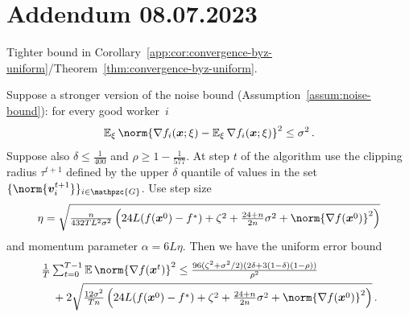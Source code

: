 \documentclass{article}
\newcommand{\gset}{\ensuremath{{\mathpzc{G}}}}
\begin{document}
\section{Addendum 08.07.2023}\label{sec:addendum}

Tighter bound in Corollary~\ref{app:cor:convergence-byz-uniform}/Theorem~\ref{thm:convergence-byz-uniform}.

\begin{corollary}\label{app:cor:convergence-byz-uniform-new}
  Suppose a stronger version of the noise bound (Assumption~\ref{assum:noise-bound}): for every good worker~$i$
\[
  \E_\xi \norm{\nabla f_i(\xx; \xi) - \E_\xi \nabla f_i(\xx; \xi)}^2 \leq \sigma^2 \, .
\]
  Suppose also $\delta \le \tfrac{1}{400}$ and $\rho \ge 1 - \tfrac{1}{577}$. At step $t$ of the algorithm use the clipping radius $\tau^{t+1}$ defined by the upper $\delta$ quantile of values in the set $\{\norm{\vv_i^{t+1}}\}_{i\in\gset}$. 
  Use step size
  \[
    \eta 
    =
    \sqrt{
      \tfrac{n}{432 T L^2 \sigma^2}
      \left(
        24L(f(\xx^0) - f^\ast)
        +
        \zeta^2
        +
        \tfrac{24+n}{2n} \sigma^2 
        +
        \norm{\nabla f(\xx^0) }^2
      \right)
    }
  \] 
  and momentum parameter $\alpha = 6 L \eta$. 
  Then we have the uniform error bound 
  \begin{align*}
    & \tfrac{1}{T} \tsum_{t=0}^{T-1} \E \norm{\nabla f(\xx^t)}^2 
    \le  
    \tfrac{96(\zeta^2 + \sigma^2/2)(2 \delta + 3(1-\delta)(1-\rho))}{\rho^2} 
    \\
    &\quad 
    + 2 \sqrt{
    \tfrac{12 \sigma^2 }{T n}
    \left(
      24L(f(\xx^0) - f^\ast)
      +
      \zeta^2
      +
      \tfrac{24+n}{2n} \sigma^2 
      +
      \norm{\nabla f(\xx^0) }^2
    \right)
    }
    \, .
  \end{align*}
\end{corollary}
\end{document}
